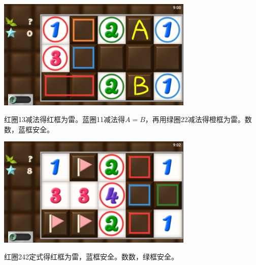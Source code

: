 \subsection{} %
\begin{center}
    \includegraphics[width=0.7\textwidth]{puzzle/115-1.png}
\end{center}
红圈13减法得红框为雷。蓝圈11减法得$A=B$，再用绿圈22减法得橙框为雷。数数，蓝框安全。
\begin{center}
    \includegraphics[width=0.7\textwidth]{puzzle/115-2.png}
\end{center}
红圈242定式得红框为雷，蓝框安全。数数，绿框安全。

